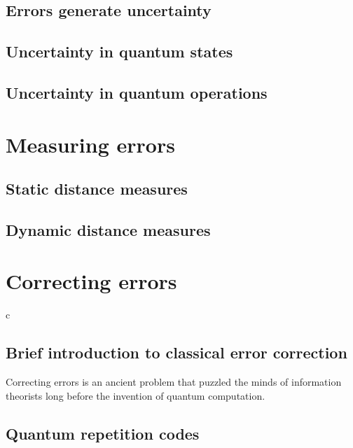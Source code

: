 \documentclass{article}
\begin{document}
\subsection{Errors generate uncertainty}

 

\subsection{Uncertainty in quantum states}

\subsection{Uncertainty in quantum operations}

\section{Measuring errors}

\subsection{Static distance measures}

\subsection{Dynamic distance measures}

\section{Correcting errors}
c
\subsection{Brief introduction to classical error correction}

Correcting errors is an ancient problem that puzzled the minds of
information theorists long before the invention of quantum computation.

\subsection{Quantum repetition codes}
\end{document}
